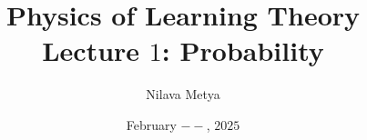 
\usepackage[
backend=biber,
style=alphabetic,%
citestyle=ieee-alphabetic,
maxnames=10,
sorting=ynt
]{biblatex}
%
\title{\textbf{Physics of Learning Theory}\\ Lecture $1$: Probability}
\usepackage{quiver}
\usepackage[nobottomtitles*]{titlesec}
\usepackage{titletoc}
\author{Nilava Metya}
\date{\vspace{-0.7in}February $--$, $2025$}
\usepackage{pdfpages}
\usepackage{fancyhdr}
	\pagestyle{fancyplain}
	\fancyhf{}
	\fancyhead[R]{\thepage}
\newcommand{\fa}{~\forall~}


\maketitle


